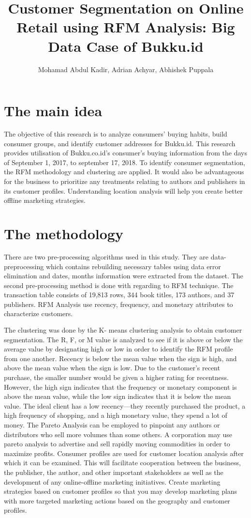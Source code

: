 \documentclass[a4paper]{article}
\title{Customer Segmentation on Online Retail using RFM Analysis: Big Data Case of Bukku.id}
\author[1]{Mohamad Abdul Kadir, Adrian Achyar, Abhishek Puppala}
\begin{document}
\maketitle
\section{The main idea}

The objective of this research is to analyze consumers' buying habits, build consumer groups, and identify customer addresses for Bukku.id. This research provides utilisation of Bukku.co.id's consumer's buying information from the days of September 1, 2017, to september 17, 2018. To identify consumer segmentation, the RFM methodology and clustering are applied. It would also be advantageous for the business to prioritize any treatments relating to authors and publishers in its customer profiles. Understanding location analysis will help you create better offline marketing strategies.

\section{The methodology }

There are two pre-processing algorithms used in this study. They are data-preprocessing which contains rebuilding necessary tables using data error elimination and dates, months information were extracted from the dataset. The second pre-processing method is done with regarding to RFM technique. The transaction table consists of 19,813 rows, 344 book titles, 173 authors, and 37 publishers. RFM Analysis use recency, frequency, and monetary attributes to characterize customers.

The clustering was done by the K- means clustering analysis to obtain customer segmentation. The R, F, or M value is analyzed to see if it is above or below the average value by designating high or low in order to identify the RFM profile from one another. Recency is below the mean value when the sign is high, and above the mean value when the sign is low. Due to the customer's recent purchase, the smaller number would be given a higher rating for recentness. However, the high sign indicates that the frequency or monetary component is above the mean value, while the low sign indicates that it is below the mean value. The ideal client has a low recency—they recently purchased the product, a high frequency of shopping, and a high monetary value, they spend a lot of money. The Pareto Analysis can be employed to pinpoint any authors or distributors who sell more volumes than some others. A corporation may use pareto analysis to advertise and sell rapidly moving commodities in order to maximize profits. Consumer profiles are used for customer location analysis after which it can be examined. This will facilitate cooperation between the business, the publisher, the author, and other important stakeholders as well as the development of any online-offline marketing initiatives. Create marketing strategies based on customer profiles so that you may develop marketing plans with more targeted marketing actions based on the geography and customer profiles.
\end{document}
